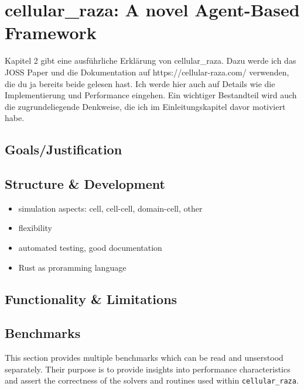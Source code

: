 \pagebreak
\section{cellular\_raza: A novel Agent-Based Framework}
\cite{Pleyer2025}

Kapitel 2 gibt eine ausführliche Erklärung von cellular\_raza. Dazu werde ich das JOSS
Paper und die Dokumentation auf https://cellular-raza.com/ verwenden, die du ja bereits
beide gelesen hast. Ich werde hier auch auf Details wie die Implementierung und
Performance eingehen. Ein wichtiger Bestandteil wird auch die zugrundeliegende Denkweise,
die ich im Einleitungskapitel davor motiviert habe.

\subsection{Goals/Justification}
\subsection{Structure \& Development}
\begin{itemize}
    \item simulation aspects: cell, cell-cell, domain-cell, other
    \item flexibility
    \item automated testing, good documentation
    \item Rust as proramming language
\end{itemize}

\subsection{Functionality \& Limitations}

\subsection{Benchmarks}
This section provides multiple benchmarks which can be read and unserstood separately.
Their purpose is to provide insights into performance characteristics and assert the correctness of
the solvers and routines used within \texttt{cellular\_raza}.

